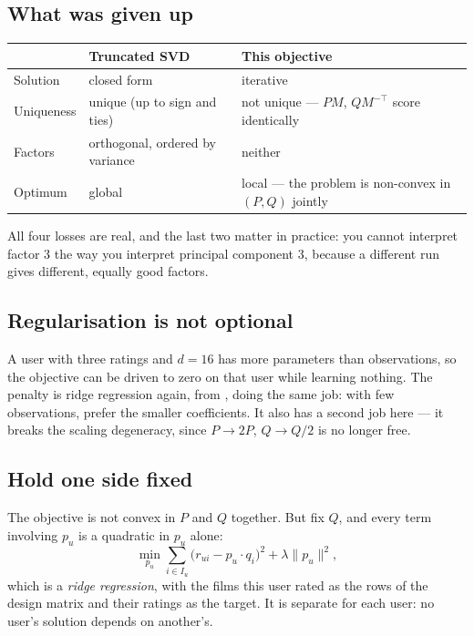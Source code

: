 \documentclass[11pt,a4paper]{article}
\begin{document}
\subsection{What was given up}

\begin{center}
\small
\begin{tabular}{p{}p{}p{}}
\toprule
 & \textbf{Truncated SVD} & \textbf{This objective} \\
\midrule
Solution   & closed form & iterative \\
Uniqueness & unique (up to sign and ties) & not unique --- $PM$, $QM^{-\top}$
score identically \\
Factors    & orthogonal, ordered by variance & neither \\
Optimum    & global & local --- the problem is non-convex in $(P,Q)$ jointly \\
\bottomrule
\end{tabular}
\end{center}

All four losses are real, and the last two matter in practice: you cannot
interpret factor 3 the way you interpret principal component 3, because a
different run gives different, equally good factors.

\subsection{Regularisation is not optional}

A user with three ratings and $d = 16$ has more parameters than observations,
so the objective can be driven to zero on that user while learning nothing. The
penalty is ridge regression again, from , doing the same job: with
few observations, prefer the smaller coefficients. It also has a second job
here --- it breaks the scaling degeneracy, since $P \to 2P$, $Q \to Q/2$ is no
longer free.

\subsection{Hold one side fixed}

The objective is not convex in $P$ and $Q$ together. But fix $Q$, and every
term involving $p_u$ is a quadratic in $p_u$ alone:
\[
  \min_{p_u} \sum_{i \in I_u} \big(r_{ui} - p_u\cdot q_i\big)^2
  + \lambda\|p_u\|^2 ,
\]
which is a \emph{ridge regression}, with the films this user rated as the rows
of the design matrix and their ratings as the target. It is separate for each
user: no user's solution depends on another's.
\end{document}

